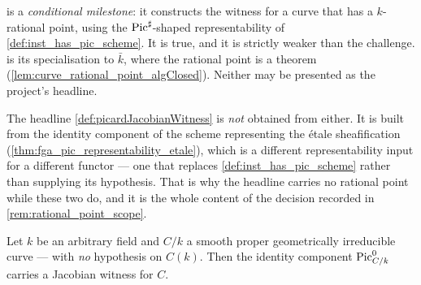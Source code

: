 \begin{remark}
  \label{rem:pointed_witness_scope}
   is a \emph{conditional
  milestone}: it constructs the witness for a curve that has a \(k\)-rational point,
  using the \(\operatorname{Pic}^\sharp\)-shaped representability of
  \cref{def:inst_has_pic_scheme}. It is true, and it is strictly weaker than the
  challenge.  is its specialisation to
  \(\bar k\), where the rational point is a theorem
  (\cref{lem:curve_rational_point_algClosed}). Neither may be presented as the
  project's headline.

  The headline \cref{def:picardJacobianWitness} is \emph{not} obtained from either.
  It is built from the identity component of the scheme representing the \'etale
  sheafification (\cref{thm:fga_pic_representability_etale}), which is a different
  representability input for a different functor --- one that replaces
  \cref{def:inst_has_pic_scheme} rather than supplying its hypothesis. That is why the
  headline carries no rational point while these two do, and it is the whole content
  of the decision recorded in \cref{rem:rational_point_scope}.
\end{remark}

\begin{theorem}
  \label{def:picardJacobianWitness}
  Let \(k\) be an arbitrary field and \(C/k\) a smooth proper geometrically
  irreducible curve --- with \emph{no} hypothesis on \(C(k)\). Then the identity
  component \(\operatorname{Pic}^0_{C/k}\) carries a Jacobian witness for \(C\).
\end{theorem}

